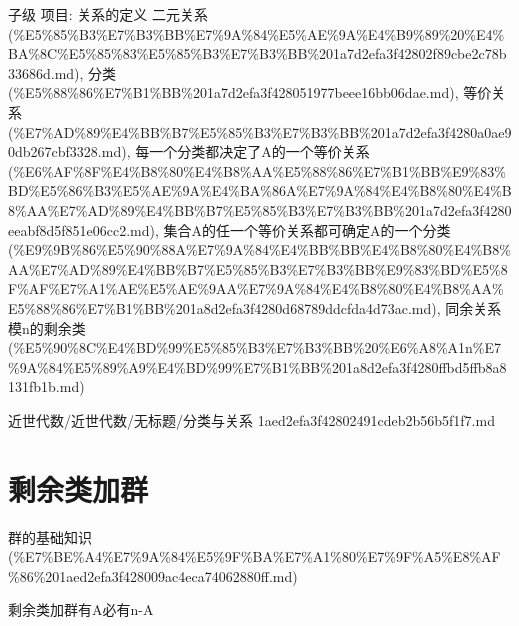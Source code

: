\begin{note}[分类与关系]

子级 项目: 关系的定义 二元关系 (\%E5\%85\%B3\%E7\%B3\%BB\%E7\%9A\%84\%E5\%AE\%9A\%E4\%B9\%89\%20\%E4\%BA\%8C\%E5\%85\%83\%E5\%85\%B3\%E7\%B3\%BB\%201a7d2efa3f42802f89cbe2c78b33686d.md), 分类 (\%E5\%88\%86\%E7\%B1\%BB\%201a7d2efa3f428051977beee16bb06dae.md), 等价关系 (\%E7\%AD\%89\%E4\%BB\%B7\%E5\%85\%B3\%E7\%B3\%BB\%201a7d2efa3f4280a0ae90db267cbf3328.md), 每一个分类都决定了A的一个等价关系 (\%E6\%AF\%8F\%E4\%B8\%80\%E4\%B8\%AA\%E5\%88\%86\%E7\%B1\%BB\%E9\%83\%BD\%E5\%86\%B3\%E5\%AE\%9A\%E4\%BA\%86A\%E7\%9A\%84\%E4\%B8\%80\%E4\%B8\%AA\%E7\%AD\%89\%E4\%BB\%B7\%E5\%85\%B3\%E7\%B3\%BB\%201a7d2efa3f4280eeabf8d5f851e06cc2.md), 集合A的任一个等价关系都可确定A的一个分类 (\%E9\%9B\%86\%E5\%90\%88A\%E7\%9A\%84\%E4\%BB\%BB\%E4\%B8\%80\%E4\%B8\%AA\%E7\%AD\%89\%E4\%BB\%B7\%E5\%85\%B3\%E7\%B3\%BB\%E9\%83\%BD\%E5\%8F\%AF\%E7\%A1\%AE\%E5\%AE\%9AA\%E7\%9A\%84\%E4\%B8\%80\%E4\%B8\%AA\%E5\%88\%86\%E7\%B1\%BB\%201a8d2efa3f4280d68789ddcfda4d73ac.md), 同余关系 模n的剩余类 (\%E5\%90\%8C\%E4\%BD\%99\%E5\%85\%B3\%E7\%B3\%BB\%20\%E6\%A8\%A1n\%E7\%9A\%84\%E5\%89\%A9\%E4\%BD\%99\%E7\%B1\%BB\%201a8d2efa3f4280ffbd5ffb8a8131fb1b.md)

\end{note}

\begin{note}[来源路径]

近世代数/近世代数/无标题/分类与关系 1aed2efa3f42802491cdeb2b56b5f1f7.md

\end{note}

\section*{剩余类加群}

\begin{note}[来源上级主题]

群的基础知识 (\%E7\%BE\%A4\%E7\%9A\%84\%E5\%9F\%BA\%E7\%A1\%80\%E7\%9F\%A5\%E8\%AF\%86\%201aed2efa3f428009ac4eca74062880ff.md)

\end{note}

\begin{note}[剩余类加群]

剩余类加群有A必有n-A

\end{note}

